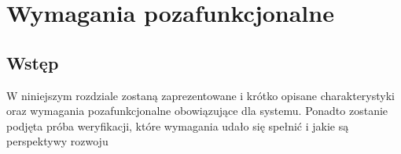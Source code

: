 \chapter{Wymagania pozafunkcjonalne}
\label{Chapter4}

\section{Wstęp}
\label{Chapter41}

W niniejszym rozdziale zostaną zaprezentowane i krótko opisane charakterystyki oraz wymagania pozafunkcjonalne obowiązujące dla systemu. Ponadto zostanie podjęta próba weryfikacji, które wymagania udało się spełnić i jakie są perspektywy rozwoju

%
%
%
%
